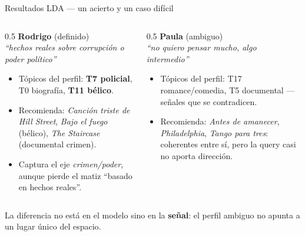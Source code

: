 \documentclass[10pt,aspectratio=169]{beamer}
\begin{document}
\begin{frame}{Resultados LDA --- un acierto y un caso difícil}
  \begin{columns}
    \begin{column}{0.5\textwidth}
      \textbf{Rodrigo} (definido) \\
      \footnotesize\textit{``hechos reales sobre corrupción o poder político''}
      \begin{itemize}\footnotesize
        \item Tópicos del perfil: \textbf{T7 policial}, T0 biografía, \textbf{T11 bélico}.
        \item Recomienda: \textit{Canción triste de Hill Street}, \textit{Bajo el fuego} (bélico), \textit{The Staircase} (documental crimen).
        \item Captura el eje \emph{crimen/poder}, aunque pierde el matiz ``basado en hechos reales''.
      \end{itemize}
    \end{column}
    \begin{column}{0.5\textwidth}
      \textbf{Paula} (ambiguo) \\
      \footnotesize\textit{``no quiero pensar mucho, algo intermedio''}
      \begin{itemize}\footnotesize
        \item Tópicos del perfil: T17 romance/comedia, T5 documental --- señales que se contradicen.
        \item Recomienda: \textit{Antes de amanecer}, \textit{Philadelphia}, \textit{Tango para tres}: coherentes entre sí, pero la query casi no aporta dirección.
      \end{itemize}
    \end{column}
  \end{columns}
  \vspace{0.4em}
  \footnotesize La diferencia no está en el modelo sino en la \textbf{señal}: el perfil ambiguo no apunta a un lugar único del espacio.
\end{frame}
\end{document}
